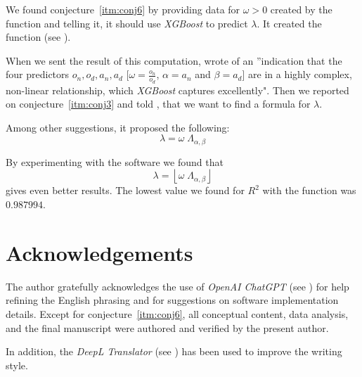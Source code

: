 \documentclass[11pt]{article}
\theoremstyle{remark}
\begin{document}
We found conjecture~\ref{itm:conj6} by providing \chat data for $\omega > 0$ created by the \langc function  and telling it, it should use \emph{XGBoost} to predict $\lambda$. It created the \langp function  (see \cite{Kunert2025}). 

When we sent the result of this computation, \chat wrote of an ”indication that the four predictors \(o_n, o_d, a_n, a_d\) [$\omega = \frac{o_n}{o_d}$, $\alpha = a_n$ and $\beta = a_d$] are in a highly complex, non-linear relationship, which \emph{XGBoost} captures excellently". Then we reported on conjecture~\ref{itm:conj3} and told \chat, that we want to find a formula for $\lambda$.

Among other suggestions, it proposed the following:
%
\begin{equation}
\lambda = \omega \; \Lambda_{\alpha, \beta}
\end{equation}

By experimenting with the \langc software we found that
%
\begin{equation}
\lambda = \left\lfloor \omega \; \Lambda_{\alpha, \beta} \right\rfloor
\end{equation}
%
gives even better results. The lowest value we found for $R^2$ with the \langc function  was $0.987994$.

\section*{Acknowledgements}

The author gratefully acknowledges the use of \emph{OpenAI ChatGPT} (see \cite{ChatGPT}) for help refining the English phrasing and for suggestions on software implementation details. Except for conjecture~\ref{itm:conj6}, all conceptual content, data analysis, and the final manuscript were authored and verified by the present author.

In addition, the \emph{DeepL Translator} (see \cite{DeepL}) has been used to improve the writing style.
\end{document}
